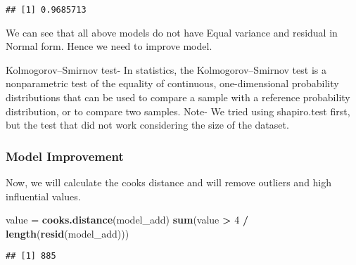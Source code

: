 \documentclass[
]{article}
\newenvironment{Shaded}{\begin{snugshade}}{\end{snugshade}}
\newcommand{\DecValTok}[1]{\textcolor[rgb]{0.00,0.00,0.81}{#1}}
\newcommand{\KeywordTok}[1]{\textcolor[rgb]{0.13,0.29,0.53}{\textbf{#1}}}
\newcommand{\NormalTok}[1]{#1}
\newcommand{\OperatorTok}[1]{\textcolor[rgb]{0.81,0.36,0.00}{\textbf{#1}}}
\newcommand{\StringTok}[1]{\textcolor[rgb]{0.31,0.60,0.02}{#1}}
\begin{document}
\begin{verbatim}
## [1] 0.9685713
\end{verbatim}

We can see that all above models do not have Equal variance and residual
in Normal form. Hence we need to improve model.

Kolmogorov--Smirnov test- In statistics, the Kolmogorov--Smirnov test is
a nonparametric test of the equality of continuous, one-dimensional
probability distributions that can be used to compare a sample with a
reference probability distribution, or to compare two samples. Note- We
tried using shapiro.test first, but the test that did not work
considering the size of the dataset.

\hypertarget{model-improvement}{%
\subsubsection{Model Improvement}\label{model-improvement}}

Now, we will calculate the cooks distance and will remove outliers and
high influential values.

\begin{Shaded}
\begin{Highlighting}[]
\NormalTok{value =}\StringTok{ }\KeywordTok{cooks.distance}\NormalTok{(model_add)}
\KeywordTok{sum}\NormalTok{(value }\OperatorTok{>}\StringTok{ }\DecValTok{4} \OperatorTok{/}\StringTok{ }\KeywordTok{length}\NormalTok{(}\KeywordTok{resid}\NormalTok{(model_add)))}
\end{Highlighting}
\end{Shaded}

\begin{verbatim}
## [1] 885
\end{verbatim}
\end{document}
